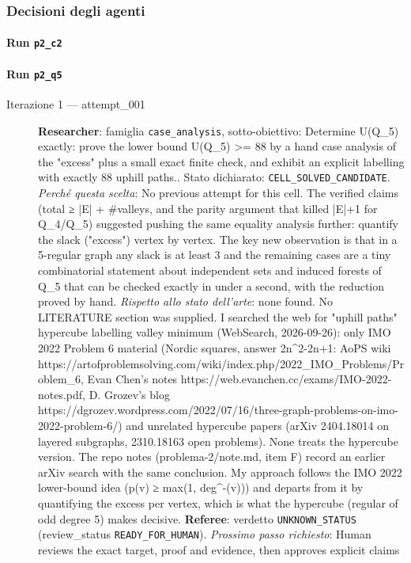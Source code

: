 \documentclass[11pt,a4paper]{article}
\begin{document}
\subsubsection{Decisioni degli agenti}
\paragraph{Run \texttt{p2\_c2}}
\paragraph{Run \texttt{p2\_q5}}
\begin{description}
\item[Iterazione 1 — attempt\_001]
\textbf{Researcher}: famiglia \texttt{case\_analysis}, sotto-obiettivo: Determine U(Q\_5) exactly: prove the lower bound U(Q\_5) \textgreater{}= 88 by a hand case analysis of the "excess" plus a small exact finite check, and exhibit an explicit labelling with exactly 88 uphill paths.. Stato dichiarato: \texttt{CELL\_SOLVED\_CANDIDATE}.
\emph{Perché questa scelta}: No previous attempt for this cell. The verified claims (total ≥ |E| + \#valleys, and the parity argument that killed |E|+1 for Q\_4/Q\_5) suggested pushing the same equality analysis further: quantify the slack ("excess") vertex by vertex. The key new observation is that in a 5-regular graph any slack is at least 3 and the remaining cases are a tiny combinatorial statement about independent sets and induced forests of Q\_5 that can be checked exactly in under a second, with the reduction proved by hand.
\emph{Rispetto allo stato dell'arte}: none found. No LITERATURE section was supplied. I searched the web for "uphill paths" hypercube labelling valley minimum (WebSearch, 2026-09-26): only IMO 2022 Problem 6 material (Nordic squares, answer 2n\textasciicircum{}2-2n+1: AoPS wiki https://artofproblemsolving.com/wiki/index.php/2022\_IMO\_Problems/Problem\_6, Evan Chen's notes https://web.evanchen.cc/exams/IMO-2022-notes.pdf, D. Grozev's blog https://dgrozev.wordpress.com/2022/07/16/three-graph-problems-on-imo-2022-problem-6/) and unrelated hypercube papers (arXiv 2404.18014 on layered subgraphs, 2310.18163 open problems). None treats the hypercube version. The repo notes (problema-2/note.md, item F) record an earlier arXiv search with the same conclusion. My approach follows the IMO 2022 lower-bound idea (p(v) ≥ max(1, deg\textasciicircum{}-(v))) and departs from it by quantifying the excess per vertex, which is what the hypercube (regular of odd degree 5) makes decisive.
\textbf{Referee}: verdetto \texttt{UNKNOWN\_STATUS} (review\_status \texttt{READY\_FOR\_HUMAN}).
\emph{Prossimo passo richiesto}: Human reviews the exact target, proof and evidence, then approves explicit claims
\end{description}
\end{document}

